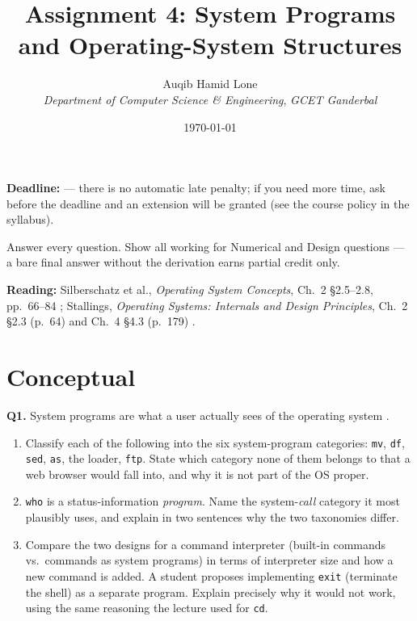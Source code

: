 \documentclass[11pt]{article}
\title{Assignment 4: System Programs and Operating-System Structures}
\author{Auqib Hamid Lone\\[0.3em]
  \emph{Department of Computer Science \& Engineering}, \emph{GCET Ganderbal}}
\date{\today}
\begin{document}
\maketitle

\noindent\textbf{Deadline:}  --- there is no automatic late penalty; if you need more time, ask before the deadline and an extension will be granted (see the course policy in the syllabus).

\noindent Answer every question. Show all working for Numerical and Design questions --- a bare final answer without the derivation earns partial credit only.

\noindent\textbf{Reading:} Silberschatz et al., \emph{Operating System Concepts}, Ch.~2 \S2.5--2.8, pp.~66--84 \cite{SilberschatzOSC_operating_system_concepts}; Stallings, \emph{Operating Systems: Internals and Design Principles}, Ch.~2 \S2.3 (p.~64) and Ch.~4 \S4.3 (p.~179) \cite{StallingsOS_internals_design_principles}.

\section{Conceptual}

\textbf{Q1.} System programs are what a user actually sees of the operating system \cite{SilberschatzOSC_operating_system_concepts}.
\begin{enumerate}
  \item[(a)] Classify each of the following into the six system-program categories: \texttt{mv}, \texttt{df}, \texttt{sed}, \texttt{as}, the loader, \texttt{ftp}. State which category none of them belongs to that a web browser would fall into, and why it is not part of the OS proper.
  \item[(b)] \texttt{who} is a status-information \emph{program}. Name the system-\emph{call} category it most plausibly uses, and explain in two sentences why the two taxonomies differ.
  \item[(c)] Compare the two designs for a command interpreter (built-in commands vs.\ commands as system programs) in terms of interpreter size and how a new command is added. A student proposes implementing \texttt{exit} (terminate the shell) as a separate program. Explain precisely why it would not work, using the same reasoning the lecture used for \texttt{cd}.
\end{enumerate}
\end{document}

